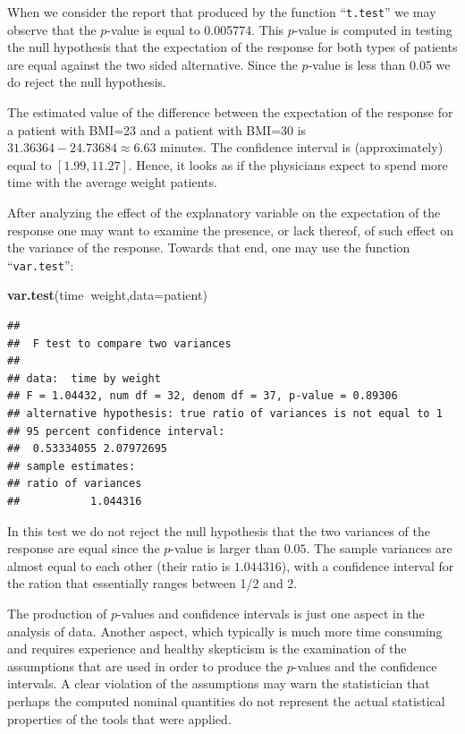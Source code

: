 \documentclass[]{krantz}
\makeatletter
\newenvironment{Shaded}{\begin{snugshade}}{\end{snugshade}}
\newcommand{\DataTypeTok}[1]{\textcolor[rgb]{0.13,0.29,0.53}{#1}}
\newcommand{\KeywordTok}[1]{\textcolor[rgb]{0.13,0.29,0.53}{\textbf{#1}}}
\newcommand{\NormalTok}[1]{#1}
\newcommand{\OperatorTok}[1]{\textcolor[rgb]{0.81,0.36,0.00}{\textbf{#1}}}
\newenvironment{kframe}{%
\medskip{}
\setlength{\fboxsep}{.8em}
 \def\at@end@of@kframe{}%
 \ifinner\ifhmode%
  \def\at@end@of@kframe{\end{minipage}}%
  \begin{minipage}{\columnwidth}%
 \fi\fi%
 \def\FrameCommand##1{\hskip\@totalleftmargin \hskip-\fboxsep
 \colorbox{shadecolor}{##1}\hskip-\fboxsep
     \hskip-\linewidth \hskip-\@totalleftmargin \hskip\columnwidth}%
 \MakeFramed {\advance\hsize-\width
   \@totalleftmargin\z@ \linewidth\hsize
   \@setminipage}}%
 {\par\unskip\endMakeFramed%
 \at@end@of@kframe}
\renewenvironment{Shaded}{\begin{kframe}}{\end{kframe}}
\theoremstyle{definition}
\theoremstyle{definition}
\theoremstyle{definition}
\theoremstyle{remark}
\makeatother
\begin{document}
When we consider the report that produced by the function ``\texttt{t.test}'' we
may observe that the \(p\)-value is equal to 0.005774. This \(p\)-value is
computed in testing the null hypothesis that the expectation of the
response for both types of patients are equal against the two sided
alternative. Since the \(p\)-value is less than 0.05 we do reject the null
hypothesis.

The estimated value of the difference between the expectation of the
response for a patient with BMI=23 and a patient with BMI=30 is
\(31.36364 -24.73684 \approx 6.63\) minutes. The confidence interval is
(approximately) equal to \([1.99, 11.27]\). Hence, it looks as if the
physicians expect to spend more time with the average weight patients.

After analyzing the effect of the explanatory variable on the
expectation of the response one may want to examine the presence, or
lack thereof, of such effect on the variance of the response. Towards
that end, one may use the function ``\texttt{var.test}'':

\begin{Shaded}
\begin{Highlighting}[]
\KeywordTok{var.test}\NormalTok{(time}\OperatorTok{~}\NormalTok{weight,}\DataTypeTok{data=}\NormalTok{patient)}
\end{Highlighting}
\end{Shaded}

\begin{verbatim}
## 
##  F test to compare two variances
## 
## data:  time by weight
## F = 1.04432, num df = 32, denom df = 37, p-value = 0.89306
## alternative hypothesis: true ratio of variances is not equal to 1
## 95 percent confidence interval:
##  0.53334055 2.07972695
## sample estimates:
## ratio of variances 
##           1.044316
\end{verbatim}

In this test we do not reject the null hypothesis that the two variances
of the response are equal since the \(p\)-value is larger than \(0.05\). The
sample variances are almost equal to each other (their ratio is
\(1.044316\)), with a confidence interval for the ration that essentially
ranges between 1/2 and 2.

The production of \(p\)-values and confidence intervals is just one aspect
in the analysis of data. Another aspect, which typically is much more
time consuming and requires experience and healthy skepticism is the
examination of the assumptions that are used in order to produce the
\(p\)-values and the confidence intervals. A clear violation of the
assumptions may warn the statistician that perhaps the computed nominal
quantities do not represent the actual statistical properties of the
tools that were applied.
\end{document}
